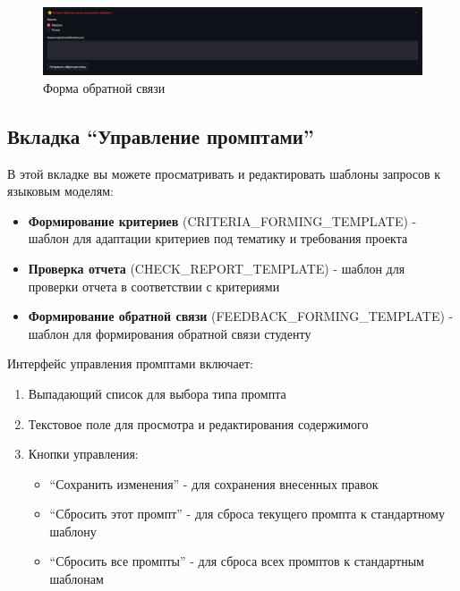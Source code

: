 \documentclass[a4paper,12pt]{article}
\begin{document}
\begin{figure}[!htb]
    \centering
    \includegraphics[width=\linewidth]{assets/feedback_form.png}
    \caption{Форма обратной связи}
\end{figure}

\FloatBarrier
\begin{samepage}
\subsection{Вкладка ``Управление промптами''}
В этой вкладке вы можете просматривать и редактировать шаблоны запросов к языковым моделям:

\begin{itemize}
    \item \textbf{Формирование критериев} (CRITERIA\_FORMING\_TEMPLATE) - шаблон для адаптации критериев под тематику и требования проекта
    \item \textbf{Проверка отчета} (CHECK\_REPORT\_TEMPLATE) - шаблон для проверки отчета в соответствии с критериями
    \item \textbf{Формирование обратной связи} (FEEDBACK\_FORMING\_TEMPLATE) - шаблон для формирования обратной связи студенту
\end{itemize}

Интерфейс управления промптами включает:
\begin{enumerate}
    \item Выпадающий список для выбора типа промпта
    \item Текстовое поле для просмотра и редактирования содержимого
    \item Кнопки управления:
    \begin{itemize}
        \item ``Сохранить изменения'' - для сохранения внесенных правок
        \item ``Сбросить этот промпт'' - для сброса текущего промпта к стандартному шаблону
        \item ``Сбросить все промпты'' - для сброса всех промптов к стандартным шаблонам
    \end{itemize}
\end{enumerate}
\end{samepage}
\end{document}
